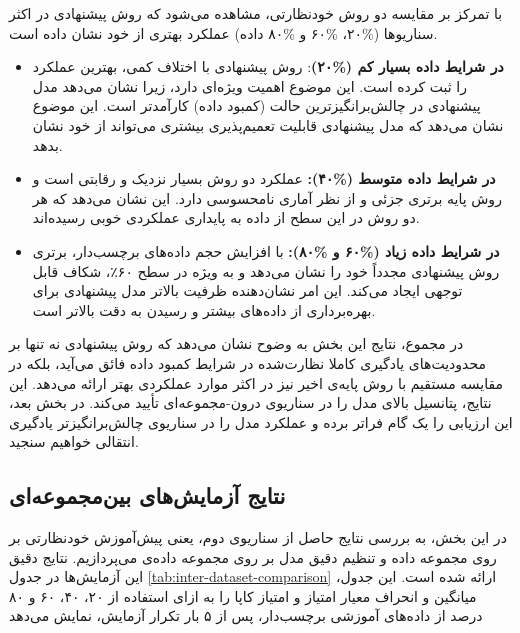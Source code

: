 با تمرکز بر مقایسه دو روش خودنظارتی، مشاهده می‌شود که روش پیشنهادی در اکثر سناریوها (\%۲۰، \%۶۰ و \%۸۰ داده) عملکرد بهتری از خود نشان داده است.
\begin{itemize}
    \item \textbf{در شرایط داده بسیار کم (\%۲۰)}: روش پیشنهادی با اختلاف کمی، بهترین عملکرد را ثبت کرده است. این موضوع اهمیت ویژه‌ای دارد، زیرا نشان می‌دهد مدل پیشنهادی در چالش‌برانگیزترین حالت (کمبود داده) کارآمدتر است. این موضوع نشان می‌دهد که مدل پیشنهادی قابلیت تعمیم‌پذیری بیشتری می‌تواند از خود نشان بدهد.
    \item \textbf{در شرایط داده متوسط (\%۴۰):} عملکرد دو روش بسیار نزدیک و رقابتی است و روش پایه برتری جزئی و از نظر آماری نامحسوسی دارد. این نشان می‌دهد که هر دو روش در این سطح از داده به پایداری عملکردی خوبی رسیده‌اند.
    \item \textbf{در شرایط داده زیاد (\%۶۰ و \%۸۰):} با افزایش حجم داده‌های برچسب‌دار، برتری روش پیشنهادی مجدداً خود را نشان می‌دهد و به ویژه در سطح ۶۰٪، شکاف قابل توجهی ایجاد می‌کند. این امر نشان‌دهنده ظرفیت بالاتر مدل پیشنهادی برای بهره‌برداری از داده‌های بیشتر و رسیدن به دقت بالاتر است.
\end{itemize}
در مجموع، نتایج این بخش به وضوح نشان می‌دهد که روش پیشنهادی نه تنها بر محدودیت‌های یادگیری کاملا نظارت‌شده در شرایط کمبود داده فائق می‌آید، بلکه در مقایسه مستقیم با روش پایه‌ی اخیر نیز در اکثر موارد عملکردی بهتر ارائه می‌دهد. این نتایج، پتانسیل بالای مدل را در سناریوی درون-مجموعه‌ای تأیید می‌کند. در بخش بعد، این ارزیابی را یک گام فراتر برده و عملکرد مدل را در سناریوی چالش‌برانگیزتر یادگیری انتقالی خواهیم سنجید.

\subsection{نتایج آزمایش‌های بین‌مجموعه‌ای}

در این بخش، به بررسی نتایج حاصل از سناریوی دوم، یعنی پیش‌آموزش خودنظارتی بر روی مجموعه داده  و تنظیم دقیق مدل بر روی مجموعه داده‌ی 
می‌پردازیم. نتایج دقیق این آزمایش‌ها در جدول
\ref{tab:inter-dataset-comparison}
ارائه شده است. این جدول، میانگین و انحراف معیار امتیاز
و امتیاز کاپا را به ازای استفاده از ۲۰، ۴۰، ۶۰ و ۸۰ درصد از داده‌های آموزشی برچسب‌دار، پس از ۵ بار تکرار آزمایش، نمایش می‌دهد

